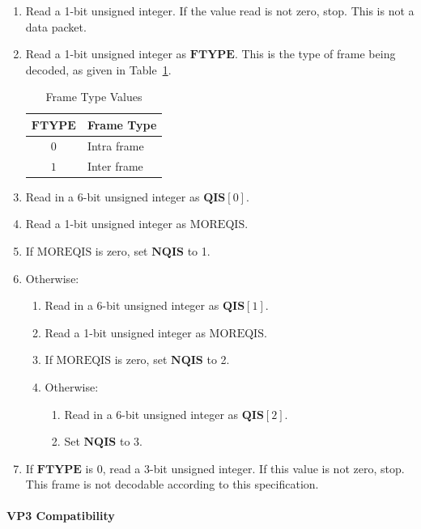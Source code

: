 \documentclass[11pt,letterpaper]{book}
\newcommand{\bitvar}[1]{\ensuremath{\mathbf{\bm #1}}}
\newcommand{\locvar}[1]{\ensuremath{\mathrm{#1}}}
\numberwithin{equation}{chapter}
\numberwithin{figure}{chapter}
\numberwithin{table}{chapter}
\begin{document}
\begin{enumerate}
\item
Read a 1-bit unsigned integer.
If the value read is not zero, stop.
This is not a data packet.
\item
Read a 1-bit unsigned integer as \bitvar{FTYPE}.
This is the type of frame being decoded, as given in
 Table~\ref{tab:frame-type}.

\begin{table}[htb]
\begin{center}
\begin{tabular}{cl}\toprule
\bitvar{FTYPE} & Frame Type  \\\midrule
$0$            & Intra frame \\
$1$            & Inter frame \\
\bottomrule\end{tabular}
\end{center}
\caption{Frame Type Values}
\label{tab:frame-type}
\end{table}

\item
Read in a 6-bit unsigned integer as $\bitvar{QIS}[0]$.
\item
Read a 1-bit unsigned integer as \locvar{MOREQIS}.
\item
If \locvar{MOREQIS} is zero, set \bitvar{NQIS} to 1.
\item
Otherwise:
\begin{enumerate}
\item
Read in a 6-bit unsigned integer as $\bitvar{QIS}[1]$.
\item
Read a 1-bit unsigned integer as \locvar{MOREQIS}.
\item
If \locvar{MOREQIS} is zero, set \bitvar{NQIS} to 2.
\item
Otherwise:
\begin{enumerate}
\item
Read in a 6-bit unsigned integer as $\bitvar{QIS}[2]$.
\item
Set \bitvar{NQIS} to 3.
\end{enumerate}
\end{enumerate}
\item
If \bitvar{FTYPE} is 0, read a 3-bit unsigned integer.
If this value is not zero, stop.
This frame is not decodable according to this specification.
\end{enumerate}

\paragraph{VP3 Compatibility}
\end{document}
